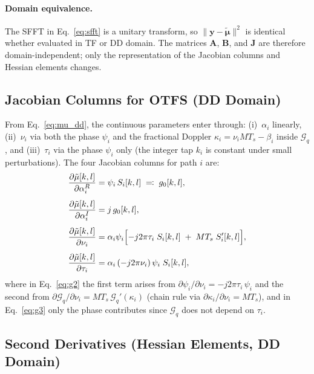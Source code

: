 \documentclass[11pt,a4paper]{article}
\newcommand{\bmtildemu}{\bm{\tilde{\mu}}}
\newcommand{\bmy}{\bm{y}}
\begin{document}
\paragraph{Domain equivalence.}
The SFFT in Eq.~\eqref{eq:sfft} is a unitary transform, so
$\|\bmy-\bmtildemu\|^2$ is identical whether evaluated in TF or DD
domain. The matrices $\bm{A}$, $\bm{B}$, and $\bm{J}$ are therefore
domain-independent; only the representation of the Jacobian columns
and Hessian elements changes.

\subsection{Jacobian Columns for OTFS (DD Domain)}

From Eq.~\eqref{eq:mu_dd}, the continuous parameters enter through:
(i)~$\alpha_i$ linearly, (ii)~$\nu_i$ via both the phase $\psi_i$ and
the fractional Doppler $\kappa_i = \nu_i MT_s - \beta_i$ inside
$\mathcal{G}_q$, and (iii)~$\tau_i$ via the phase $\psi_i$ only
(the integer tap $k_i$ is constant under small perturbations). The
four Jacobian columns for path $i$ are:
\begin{align}
  \frac{\partial\tilde{\mu}[k,l]}{\partial\alpha_i^{R}}
  &= \psi_i\,S_i[k,l]
  \;\eqqcolon\; g_0[k,l],
  \label{eq:g0}\\[4pt]
  \frac{\partial\tilde{\mu}[k,l]}{\partial\alpha_i^{I}}
  &= j\,g_0[k,l],
  \label{eq:g1}\\[4pt]
  \frac{\partial\tilde{\mu}[k,l]}{\partial\nu_i}
  &= \alpha_i\psi_i\Bigl[
    -j2\pi\tau_i\;S_i[k,l]
    \;+\; MT_s\;S_i'[k,l]\Bigr],
  \label{eq:g2}\\[4pt]
  \frac{\partial\tilde{\mu}[k,l]}{\partial\tau_i}
  &= \alpha_i\,(-j2\pi\nu_i)\,\psi_i\;S_i[k,l],
  \label{eq:g3}
\end{align}
where in Eq.~\eqref{eq:g2} the first term arises from
$\partial\psi_i/\partial\nu_i = -j2\pi\tau_i\,\psi_i$ and the second
from
$\partial\mathcal{G}_q/\partial\nu_i = MT_s\,\mathcal{G}_q'(\kappa_i)$
(chain rule via $\partial\kappa_i/\partial\nu_i = MT_s$), and in
Eq.~\eqref{eq:g3} only the phase contributes since $\mathcal{G}_q$
does not depend on $\tau_i$.

\subsection{Second Derivatives (Hessian Elements, DD Domain)}
\end{document}

